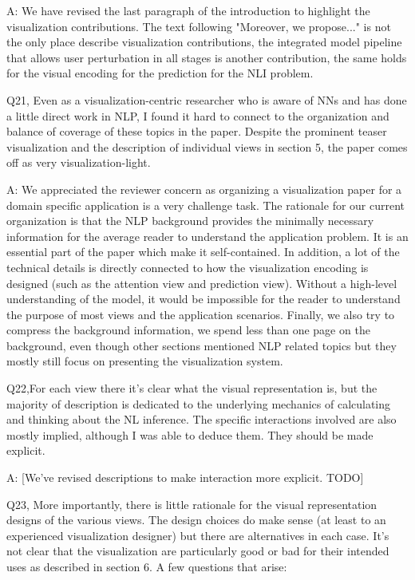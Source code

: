 A: We have revised the last paragraph of the introduction to highlight the visualization contributions. The text following "Moreover, we propose..." is not the only place describe visualization contributions, the integrated model pipeline that allows user perturbation in all stages is another contribution, the same holds for the visual encoding for the prediction for the NLI problem.

Q21, Even as a visualization-centric researcher who is aware of NNs and has done a little direct work in NLP, I found it hard to connect to the organization and balance of coverage of these topics in the paper. Despite the prominent teaser visualization and the description of individual views in section 5, the paper comes off as very visualization-light.

A: We appreciated the reviewer concern as organizing a visualization paper for a domain specific application is a very challenge task. The rationale for our current organization is that the NLP background provides the minimally necessary information for the average reader to understand the application problem. It is an essential part of the paper which make it self-contained. In addition, a lot of the technical details is directly connected to how the visualization encoding is designed (such as the attention view and prediction view). Without a high-level understanding of the model, it would be impossible for the reader to understand the purpose of most views and the application scenarios. Finally, we also try to compress the background information, we spend less than one page on the background, even though other sections mentioned NLP related topics but they mostly still focus on presenting the visualization system.


Q22,For each view there it's clear what the visual representation is, but the majority of description is dedicated to the underlying mechanics of calculating and thinking about the NL inference. The specific interactions involved are also mostly implied, although I was able to deduce them. They should be made explicit.

A: [We've revised descriptions to make interaction more explicit. TODO]


Q23, More importantly, there is little rationale for the visual representation designs of the various views. The design choices do make sense (at least to an experienced visualization designer) but there are alternatives in each case. It's not clear that the visualization are particularly good or bad for their intended uses as described in section 6. A few questions that arise:

